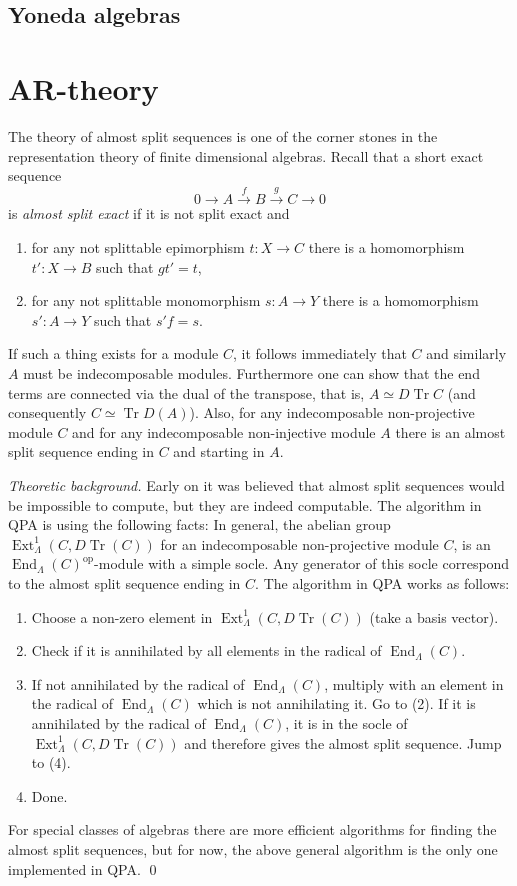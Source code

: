 \documentclass{amsart}
\newcommand{\End}{\operatorname{End}\nolimits}
\newcommand{\Tr}{\operatorname{Tr}\nolimits}
\newcommand{\Ext}{\operatorname{Ext}\nolimits}
\newcommand{\op}{{\operatorname{op}\nolimits}}
\theoremstyle{definition}
\theoremstyle{theoretic}
\newenvironment{theoback}
{\medskip\small\textit{Theoretic background.} }
{\qed\par\medskip}
\begin{document}
\subsection{Yoneda algebras}

\section{AR-theory}
The theory of almost split sequences is one of the corner stones in
the representation theory of finite dimensional algebras.  Recall that
a short exact sequence 
\[0\to A\xrightarrow{f} B\xrightarrow{g} C\to 0\]
is \emph{almost split exact} if it is not split exact and 
\begin{enumerate}[\rm(i)]
\item for any not splittable epimorphism $t\colon X\to C$ there is a
  homomorphism $t'\colon X\to B$ such that $gt' = t$, 
\item for any not splittable monomorphism $s\colon A\to Y$ there is a
  homomorphism $s'\colon A\to Y$ such that $s'f = s$.
\end{enumerate}
If such a thing exists for a module $C$, it follows immediately that
$C$ and similarly $A$ must be indecomposable modules.  Furthermore one
can show that the end terms are connected via the dual of the
transpose, that is, $A\simeq D\Tr C$ (and consequently $C\simeq \Tr
D(A)$).  Also, for any indecomposable non-projective module $C$ and
for any indecomposable non-injective module $A$ there is an almost
split sequence ending in $C$ and starting in $A$.  

\begin{theoback} 
Early on it was believed that almost split sequences would be
impossible to compute, but they are indeed computable.  The algorithm
in QPA is using the following facts:  In general, the abelian group
$\Ext^1_\Lambda(C,D\Tr(C))$ for an indecomposable non-projective
module $C$, is an $\End_\Lambda(C)^\op$-module with a simple socle.
Any generator of this socle correspond to the almost split sequence
ending in $C$.  The algorithm in QPA works as follows:  
\begin{enumerate}[\rm(1)]
\item Choose a non-zero element in $\Ext^1_\Lambda(C,D\Tr(C))$ (take a
  basis vector).
\item Check if it is annihilated by all elements in the radical of
  $\End_\Lambda(C)$. 
\item If not annihilated by the radical of $\End_\Lambda(C)$, multiply
  with an element in the radical of $\End_\Lambda(C)$ which is not
  annihilating it.  Go to (2).  If it is annihilated by the radical of
  $\End_\Lambda(C)$, it is in the socle of $\Ext^1_\Lambda(C,D\Tr(C))$
  and therefore gives the almost split sequence.  Jump to (4).
\item Done.
\end{enumerate}
For special classes of algebras there are more efficient algorithms
for finding the almost split sequences, but for now, the above general
algorithm is the only one implemented in QPA. 
\end{theoback} 
\end{document}
